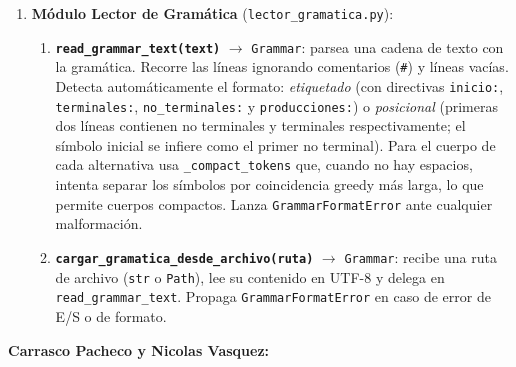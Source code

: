 \begin{enumerate}
\begin{enumerate}[label=\alph*.]
      \item \textbf{\texttt{CanonicalCollection}} (\texttt{frozen=True, slots=True}):
        contenedor del resultado final con \texttt{estados: tuple[LR0State, ...]},
        \texttt{grammar: Grammar} (ya aumentada) y
        \texttt{trace: tuple[tuple[str, str], ...]} (lista de pares operación/resultado
        generada por \texttt{construir\_coleccion}).
        La propiedad \texttt{gramatica} es alias de \texttt{grammar}.
    \end{enumerate}

  \item \textbf{Módulo Lector de Gramática} (\texttt{lector\_gramatica.py}):

    \begin{enumerate}[label=\alph*.]
      \item \textbf{\texttt{read\_grammar\_text(text)}} $\to$ \texttt{Grammar}:
        parsea una cadena de texto con la gramática. Recorre las líneas ignorando
        comentarios (\texttt{\#}) y líneas vacías. Detecta automáticamente el formato:
        \textit{etiquetado} (con directivas \texttt{inicio:}, \texttt{terminales:},
        \texttt{no\_terminales:} y \texttt{producciones:}) o
        \textit{posicional} (primeras dos líneas contienen no terminales y terminales
        respectivamente; el símbolo inicial se infiere como el primer no terminal).
        Para el cuerpo de cada alternativa usa \texttt{\_compact\_tokens} que, cuando
        no hay espacios, intenta separar los símbolos por coincidencia greedy más larga,
        lo que permite cuerpos compactos. Lanza \texttt{GrammarFormatError} ante cualquier
        malformación.

      \item \textbf{\texttt{cargar\_gramatica\_desde\_archivo(ruta)}} $\to$ \texttt{Grammar}:
        recibe una ruta de archivo (\texttt{str} o \texttt{Path}), lee su contenido en
        UTF-8 y delega en \texttt{read\_grammar\_text}. Propaga
        \texttt{GrammarFormatError} en caso de error de E/S o de formato.
    \end{enumerate}
\end{enumerate}

\vspace{0.6cm}

\newpage

\textbf{Carrasco Pacheco y Nicolas Vasquez:}

